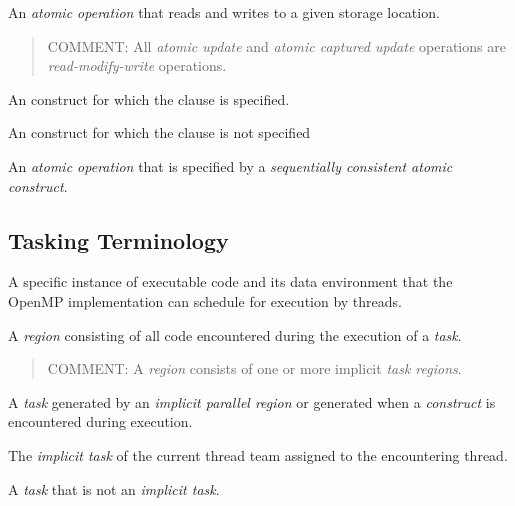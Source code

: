 \glossarydefstart
An \emph{atomic operation} that reads and writes to a given storage location.

\begin{quote}
COMMENT: All \emph{atomic update} and \emph{atomic captured update} operations
are \emph{read-modify-write} operations.
\end{quote}
\glossarydefend

\glossarydefstart
An  construct for which the  clause is specified.
\glossarydefend
\bigskip

\glossarydefstart
An  construct for which the  clause is not specified
\glossarydefend
\bigskip
\bigskip

\glossarydefstart
An \emph{atomic operation} that is specified by a 
\emph{sequentially consistent atomic construct}. 
\glossarydefend
\bigskip
\bigskip


% 
\subsection{Tasking Terminology}
\label{subsec:Tasking Terminology}
\glossarydefstart
A specific instance of executable code and its data environment that the
OpenMP implementation can schedule for execution by threads.
\glossarydefend

\glossarydefstart
A \emph{region} consisting of all code encountered during the execution 
of a \emph{task}.

\begin{quote}
COMMENT: A  \emph{region} consists of one or more implicit 
\emph{task regions}.
\end{quote}
\glossarydefend

\glossarydefstart
A \emph{task} generated by an \emph{implicit parallel region} or generated 
when a  \emph{construct} is encountered during execution.
\glossarydefend

\glossarydefstart
The \emph{implicit task} of the current thread team assigned to the 
encountering thread.
\glossarydefend

\glossarydefstart
A \emph{task} that is not an \emph{implicit task}.
\glossarydefend

